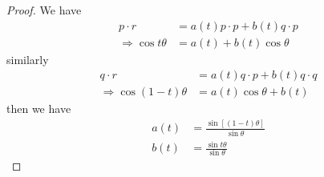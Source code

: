 \begin{itemize}
\begin{proof}
        We have
        \begin{align*}
            p\cdot r &= a(t)p\cdot p + b(t) q\cdot p\\
            \Rightarrow \cos t\theta&= a(t)+b(t)\cos\theta
        \end{align*}
        similarly
        \begin{align*}
            q\cdot r &= a(t)q\cdot p + b(t) q\cdot q\\
            \Rightarrow \cos (1-t)\theta&= a(t)\cos\theta+b(t)
        \end{align*}
        then we have
        \begin{align*}
            a(t)&=\frac{\sin[(1-t)\theta]}{\sin\theta}\\
            b(t)&=\frac{\sin t\theta}{\sin \theta}
        \end{align*}
    \end{proof}
\end{itemize}


